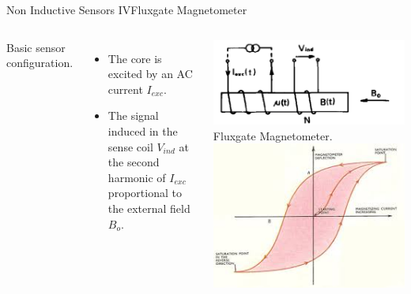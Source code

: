 \documentclass{beamer}
\begin{document}
\begin{frame}{Non Inductive Sensors IV}{Fluxgate Magnetometer}
	\begin{columns}
  	     Basic sensor configuration.
		\begin{itemize}
			\item The core is excited by an AC current $I_{exc} $.
			\item  The signal induced in the sense coil $V_{ind}$  at the second harmonic of $I_{exc} $ proportional to the external field $B_{o}$.
		\end{itemize}
	\begin{center}
		\includegraphics[width=0.8 \columnwidth]{figures/apprilleflux.png}
		{\tiny  Fluxgate Magnetometer.}
			\includegraphics[width=0.8 \columnwidth]{figures/maghyst.jpg}
	\end{center}
	\end{columns}
\end{frame}
\end{document}
